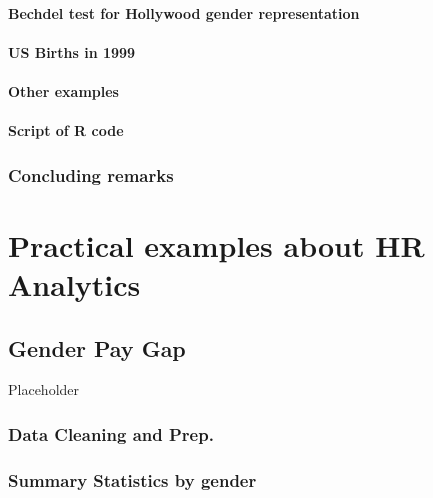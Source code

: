 \documentclass[
  12pt, krantz2,
]{krantz}
\begin{document}
\hypertarget{bechdel-test-for-hollywood-gender-representation}{%
\subsection{Bechdel test for Hollywood gender representation}\label{bechdel-test-for-hollywood-gender-representation}}

\hypertarget{us-births-in-1999}{%
\subsection{US Births in 1999}\label{us-births-in-1999}}

\hypertarget{other-examples}{%
\subsection{Other examples}\label{other-examples}}

\hypertarget{script-of-r-code-1}{%
\subsection{Script of R code}\label{script-of-r-code-1}}

\hypertarget{concluding-remarks}{%
\section*{Concluding remarks}\label{concluding-remarks}}


\hypertarget{part-practical-examples-about-hr-analytics}{%
\part{Practical examples about HR Analytics}\label{part-practical-examples-about-hr-analytics}}

\hypertarget{pay-gap}{%
\chapter{Gender Pay Gap}\label{pay-gap}}

Placeholder

\hypertarget{data-cleaning-and-prep.}{%
\section{Data Cleaning and Prep.}\label{data-cleaning-and-prep.}}

\hypertarget{summary-statistics-by-gender}{%
\section{Summary Statistics by gender}\label{summary-statistics-by-gender}}
\end{document}
